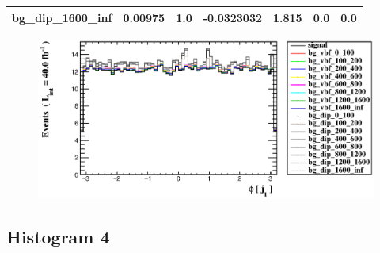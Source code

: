 \documentclass[a4paper, 10pt]{article}
\begin{document}
\begin{table}[H]
\begin{center}
\begin{tabular}{|m{23.0mm}|m{23.0mm}|m{18.0mm}|m{19.0mm}|m{19.0mm}|m{19.0mm}|m{19.0mm}|}
      \hline
      {\cellcolor{white}         bg\_dip\_1600\_inf}& {\cellcolor{white}         0.00975}& {\cellcolor{white}         1.0}& {\cellcolor{white}         -0.0323032}& {\cellcolor{white}         1.815}& {\cellcolor{green}         0.0}& {\cellcolor{green}         0.0}\\
\hline
    \end{tabular}
  \end{center}
\end{table}

\begin{figure}[H]
  \begin{center}
    \includegraphics[scale=0.45]{selection_2.eps}\\
\caption{   }
  \end{center}
\end{figure}
      \newpage
\subsection{ Histogram 4}
\end{document}
